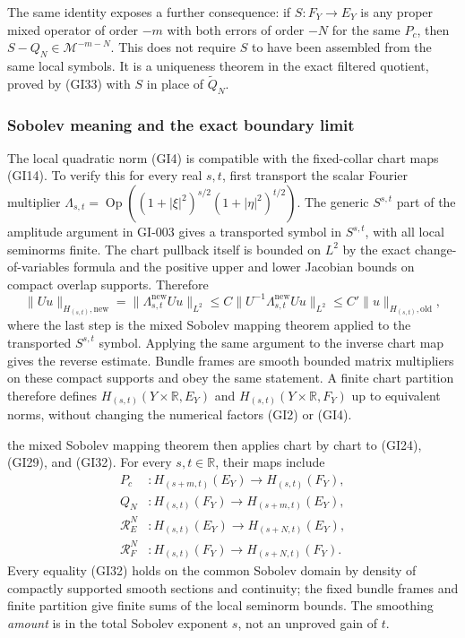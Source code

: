 \documentclass[
  11pt,
]{article}
\begin{document}
The same identity exposes a further consequence: if \(S:F_Y\to E_Y\) is
any proper mixed operator of order \(-m\) with both errors of order
\(-N\) for the same \(P_c\), then \(S-Q_N\in\mathscr M^{-m-N}\). This
does not require \(S\) to have been assembled from the same local
symbols. It is a uniqueness theorem in the exact filtered quotient,
proved by (GI33) with \(S\) in place of \(\widetilde Q_N\).

\subsubsection{Sobolev meaning and the exact boundary
limit}\label{sobolev-meaning-and-the-exact-boundary-limit}

The local quadratic norm (GI4) is compatible with the fixed-collar chart
maps (GI14). To verify this for every real \(s,t\), first transport the
scalar Fourier multiplier
\(\Lambda_{s,t}=\operatorname{Op}((1+|\xi|^2)^{s/2}(1+|\eta|^2)^{t/2})\).
The generic \(S^{s,t}\) part of the amplitude argument in GI-003 gives a
transported symbol in \(S^{s,t}\), with all local seminorms finite. The
chart pullback itself is bounded on \(L^2\) by the exact
change-of-variables formula and the positive upper and lower Jacobian
bounds on compact overlap supports. Therefore \[
 \|Uu\|_{H_{(s,t)},\mathrm{new}}
 =\|\Lambda_{s,t}^{\mathrm{new}}Uu\|_{L^2}
 \leq C\|U^{-1}\Lambda_{s,t}^{\mathrm{new}}Uu\|_{L^2}
 \leq C'\|u\|_{H_{(s,t)},\mathrm{old}},
 \tag{GI35}
\] where the last step is the mixed Sobolev mapping theorem applied to
the transported \(S^{s,t}\) symbol. Applying the same argument to the
inverse chart map gives the reverse estimate. Bundle frames are smooth
bounded matrix multipliers on these compact supports and obey the same
statement. A finite chart partition therefore defines
\(H_{(s,t)}(Y\times\mathbb R,E_Y)\) and
\(H_{(s,t)}(Y\times\mathbb R,F_Y)\) up to equivalent norms, without
changing the numerical factors (GI2) or (GI4).

the mixed Sobolev mapping theorem then applies chart by chart to (GI24),
(GI29), and (GI32). For every \(s,t\in\mathbb R\), their maps include \[
 \begin{aligned}
 P_c&:H_{(s+m,t)}(E_Y)\to H_{(s,t)}(F_Y),\\
 Q_N&:H_{(s,t)}(F_Y)\to H_{(s+m,t)}(E_Y),\\
 \mathcal R_E^N&:H_{(s,t)}(E_Y)\to H_{(s+N,t)}(E_Y),\\
 \mathcal R_F^N&:H_{(s,t)}(F_Y)\to H_{(s+N,t)}(F_Y).
 \end{aligned}
 \tag{GI36}
\] Every equality (GI32) holds on the common Sobolev domain by density
of compactly supported smooth sections and continuity; the fixed bundle
frames and finite partition give finite sums of the local seminorm
bounds. The smoothing \emph{amount} is in the total Sobolev exponent
\(s\), not an unproved gain of \(t\).
\end{document}
